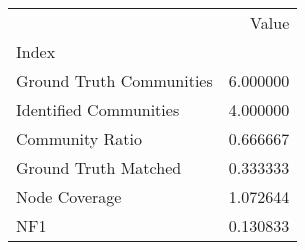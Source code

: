 \begin{tabular}{lr}
\toprule
{} &     Value \\
Index                    &           \\
\midrule
Ground Truth Communities &  6.000000 \\
Identified Communities   &  4.000000 \\
Community Ratio          &  0.666667 \\
Ground Truth Matched     &  0.333333 \\
Node Coverage            &  1.072644 \\
NF1                      &  0.130833 \\
\bottomrule
\end{tabular}
